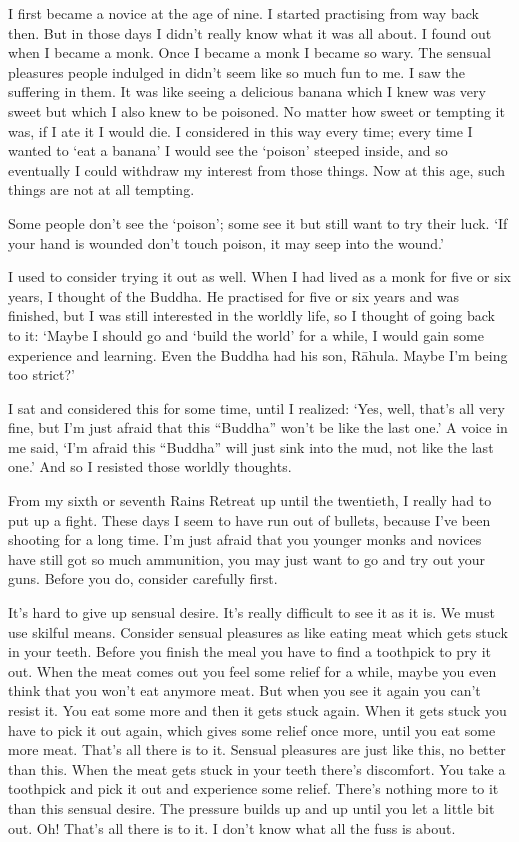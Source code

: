 I first became a novice at the age of nine. I started practising from way back then. But in those days I didn't really know what it was all about. I found out when I became a monk. Once I became a monk I became so wary. The sensual pleasures people indulged in didn't seem like so much fun to me. I saw the suffering in them. It was like seeing a delicious banana which I knew was very sweet but which I also knew to be poisoned. No matter how sweet or tempting it was, if I ate it I would die. I considered in this way every time; every time I wanted to `eat a banana' I would see the `poison' steeped inside, and so eventually I could withdraw my interest from those things. Now at this age, such things are not at all tempting.

Some people don't see the `poison'; some see it but still want to try their luck. `If your hand is wounded don't touch poison, it may seep into the wound.'

I used to consider trying it out as well. When I had lived as a monk for five or six years, I thought of the Buddha. He practised for five or six years and was finished, but I was still interested in the worldly life, so I thought of going back to it: `Maybe I should go and `build the world' for a while, I would gain some experience and learning. Even the Buddha had his son, R\=ahula. Maybe I'm being too strict?'

I sat and considered this for some time, until I realized: `Yes, well, that's all very fine, but I'm just afraid that this ``Buddha'' won't be like the last one.' A voice in me said, `I'm afraid this ``Buddha'' will just sink into the mud, not like the last one.' And so I resisted those worldly thoughts.

From my sixth or seventh Rains Retreat up until the twentieth, I really had to put up a fight. These days I seem to have run out of bullets, because I've been shooting for a long time. I'm just afraid that you younger monks and novices have still got so much ammunition, you may just want to go and try out your guns. Before you do, consider carefully first.

It's hard to give up sensual desire. It's really difficult to see it as it is. We must use skilful means. Consider sensual pleasures as like eating meat which gets stuck in your teeth. Before you finish the meal you have to find a toothpick to pry it out. When the meat comes out you feel some relief for a while, maybe you even think that you won't eat anymore meat. But when you see it again you can't resist it. You eat some more and then it gets stuck again. When it gets stuck you have to pick it out again, which gives some relief once more, until you eat some more meat. That's all there is to it. Sensual pleasures are just like this, no better than this. When the meat gets stuck in your teeth there's discomfort. You take a toothpick and pick it out and experience some relief. There's nothing more to it than this sensual desire. The pressure builds up and up until you let a little bit out. Oh! That's all there is to it. I don't know what all the fuss is about.

